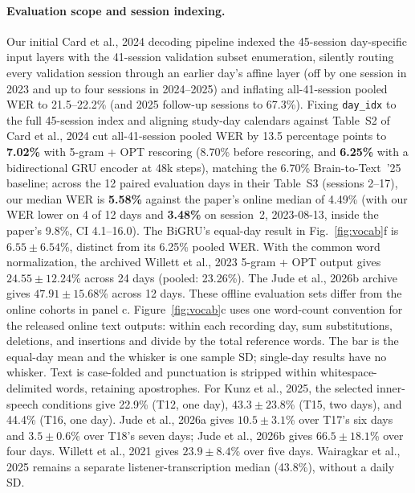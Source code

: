 \documentclass[11pt]{article}
\begin{document}
\paragraph{Evaluation scope and session indexing.} Our initial Card et al.,
2024 decoding pipeline indexed the 45-session day-specific input layers
with the 41-session validation subset enumeration, silently routing
every validation session through an earlier day's affine layer (off by
one session in 2023 and up to four sessions in 2024--2025) and inflating
all-41-session pooled WER to 21.5--22.2\% (and 2025 follow-up sessions
to 67.3\%). Fixing \texttt{day\_idx} to the full 45-session index and aligning
study-day calendars against Table~S2 of Card et al., 2024 cut all-41-session
pooled WER by 13.5 percentage points to \textbf{7.02\%} with 5-gram +
OPT rescoring (8.70\% before rescoring, and \textbf{6.25\%} with a
bidirectional GRU encoder at 48k steps), matching the 6.70\%
Brain-to-Text~'25 baseline; across the 12 paired evaluation days in
their Table~S3 (sessions 2--17), our median WER is \textbf{5.58\%} against the
paper's online median of 4.49\% (with our WER lower on 4 of 12 days and
\textbf{3.48\%} on session~2, 2023-08-13, inside the paper's 9.8\%, CI
4.1--16.0). The BiGRU's equal-day result in Fig.~\ref{fig:vocab}f is
$6.55\pm6.54$\%, distinct from its 6.25\% pooled WER. With the common
word normalization, the archived Willett et al., 2023 5-gram + OPT
output gives $24.55\pm12.24$\% across 24 days (pooled: 23.26\%).
The Jude et al., 2026b archive gives $47.91\pm15.68$\% across 12 days.
These offline evaluation sets differ from the online cohorts in panel c.
Figure~\ref{fig:vocab}c uses one word-count convention for the released
online text outputs: within each recording day, sum substitutions,
deletions, and insertions and divide by the total reference words.
The bar is the equal-day mean and the whisker is one sample SD;
single-day results have no whisker. Text is case-folded and punctuation
is stripped within whitespace-delimited words, retaining apostrophes.
For Kunz et al., 2025, the selected inner-speech conditions give 22.9\%
(T12, one day), $43.3\pm23.8$\% (T15, two days), and 44.4\%
(T16, one day). Jude et al., 2026a gives $10.5\pm3.1$\% over T17's
six days and $3.5\pm0.6$\% over T18's seven days; Jude et al., 2026b
gives $66.5\pm18.1$\% over four days. Willett et al., 2021 gives
$23.9\pm8.4$\% over five days. Wairagkar et al., 2025 remains a
separate listener-transcription median (43.8\%), without a daily SD.
\end{document}
